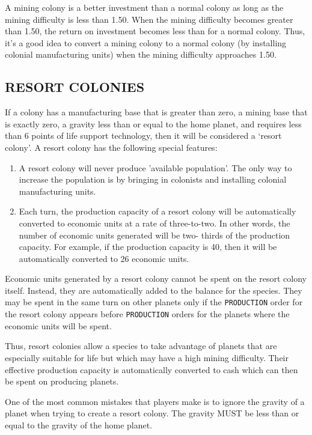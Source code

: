 \documentclass[10pt,titlepage]{article}
\begin{document}
A mining colony is a better investment than a normal colony as long as the
mining difficulty is less than 1.50.  When the mining difficulty becomes
greater than 1.50, the return on investment becomes less than for a normal
colony.  Thus, it's a good idea to convert a mining colony to a normal colony
(by installing colonial manufacturing units) when the mining difficulty
approaches 1.50.


\subsection{RESORT COLONIES}
\label{sec:resotcolonies}


If a colony has a manufacturing base that is greater than zero, a mining base
that is exactly zero, a gravity less than or equal to the home planet, and
requires less than 6 points of life support technology, then it will be
considered a `resort colony'.  A resort colony has the following special
features:
\begin{enumerate}
	\item  A resort colony will never produce 'available population'.  The
	only way to increase the population is by bringing in colonists
	and installing colonial manufacturing units.

	\item Each turn, the production capacity of a resort colony will be
	automatically converted to economic units at a rate of three-to-two.
	In other words, the number of economic units generated will be two-
	thirds of the production capacity.  For example, if the production
	capacity is 40, then it will be automatically converted to 26
	economic units.
\end{enumerate}

Economic units generated by a resort colony cannot be spent on the resort
colony itself.  Instead, they are automatically added to the balance for the
species.  They may be spent in the same turn on other planets only if the
\texttt{PRODUCTION} order for the resort colony appears before \texttt{PRODUCTION} orders for
the planets where the economic units will be spent.

Thus, resort colonies allow a species to take advantage of planets that are
especially suitable for life but which may have a high mining difficulty.
Their effective production capacity is automatically converted to cash which
can then be spent on producing planets.


\begin{importantnote}
	One of the most common mistakes that players make is to
	ignore the gravity of a planet when trying to create a
	resort colony.  The gravity MUST be less than or equal
	to the gravity of the home planet.
\end{importantnote}
\end{document}

